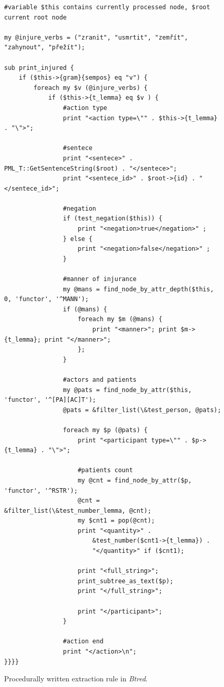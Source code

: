 \begin{figure}
\begin{verbatim}
#variable $this contains currently processed node, $root current root node

my @injure_verbs = ("zranit", "usmrtit", "zemřít", "zahynout", "přežít");

sub print_injured {
	if ($this->{gram}{sempos} eq "v") {
		foreach my $v (@injure_verbs) {
			if ($this->{t_lemma} eq $v ) {
				#action type
				print "<action type=\"" . $this->{t_lemma} . "\">";

				#sentece
				print "<sentece>" . PML_T::GetSentenceString($root) . "</sentece>";
				print "<sentece_id>" . $root->{id} . "</sentece_id>";
				
				#negation
				if (test_negation($this)) {
					print "<negation>true</negation>" ;					
				} else {
					print "<negation>false</negation>" ;										
				}
								
				#manner of injurance
				my @mans = find_node_by_attr_depth($this, 0, 'functor', '^MANN');
				if (@mans) {
					foreach my $m (@mans) {
						print "<manner>"; print $m->{t_lemma}; print "</manner>"; 
					};
				}
				
				#actors and patients
				my @pats = find_node_by_attr($this, 'functor', '^[PA][AC]T');
				@pats = &filter_list(\&test_person, @pats);
				
				foreach my $p (@pats) {
					print "<participant type=\"" . $p->{t_lemma} . "\">";

					#patients count
					my @cnt = find_node_by_attr($p, 'functor', '^RSTR');
					@cnt = &filter_list(\&test_number_lemma, @cnt);
					my $cnt1 = pop(@cnt);
					print "<quantity>" . 
						&test_number($cnt1->{t_lemma}) . 
						"</quantity>" if ($cnt1);
	
					print "<full_string>";
					print_subtree_as_text($p);
					print "</full_string>";

					print "</participant>";
				}
				
				#action end
				print "</action>\n";											
}}}}
\end{verbatim} 

\caption{Procedurally written extraction rule in \emph{Btred}.}
\label{lst:btred_rule}
\end{figure}




